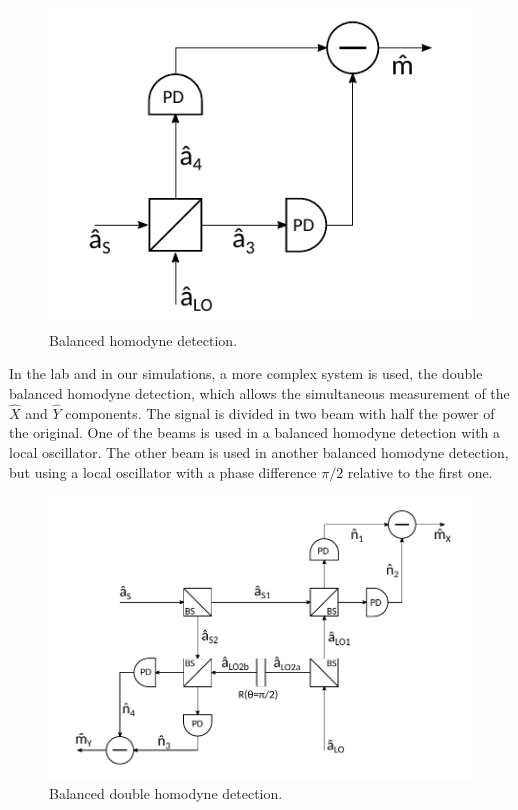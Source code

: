 \begin{bibunit}[plain]
\begin{figure}[H]
	\includegraphics{./sdf/optical_detection/figures/scheme_homodyne.pdf}
	\caption{Balanced homodyne detection.}
\end{figure}
%
In the lab and in our simulations, a more complex system is used, the double balanced homodyne detection, which allows the simultaneous measurement of the $\hat{X}$ and $\hat{Y}$ components. The signal is divided in two beam with half the power of the original. One of the beams is used in a balanced homodyne detection with a local oscillator. The other beam is used in another balanced homodyne detection, but using a local oscillator with a phase difference $\pi/2$ relative to the first one.
%
\begin{figure}[H]
	\label{fig:scheme_homodyne}
	\centering
	\includegraphics{./sdf/optical_detection/figures/scheme_double_homodyne.pdf}
	\caption{Balanced double homodyne detection.}
\end{figure}
%
%
%

\end{bibunit}
